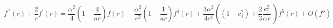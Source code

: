 \begin{equation}
f^{\prime \prime }(r)+\frac{2}{r}f^{\prime }(r)=\frac{\alpha ^{2}}{4}\left(
1-\frac{4}{ar}\right) f(r)-\frac{\alpha ^{2}}{c^{2}}\left( 1-\frac{1}{ar}%
\right) f^{3}(r)+\frac{3\alpha ^{2}}{4c^{4}}\left( (1-c_{1}^{2})+\frac{2}{3}%
\frac{c_{1}^{2}}{\alpha r}~\right) f^{5}(r)+O\left( f^{6}\right)
\label{sym}
\end{equation}%
